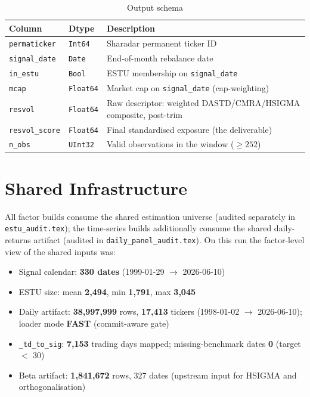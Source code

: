 \documentclass[11pt,a4paper]{article}
\begin{document}
\begin{table}[h!]
\centering
\caption{Output schema}
\begin{tabular}{llp{7.4cm}}
\toprule
\textbf{Column} & \textbf{Dtype} & \textbf{Description} \\
\midrule
\texttt{permaticker} & \texttt{Int64} & Sharadar permanent ticker ID \\
\texttt{signal\_date} & \texttt{Date} & End-of-month rebalance date \\
\texttt{in\_estu} & \texttt{Bool} & ESTU membership on \texttt{signal\_date} \\
\texttt{mcap} & \texttt{Float64} & Market cap on \texttt{signal\_date} (cap-weighting) \\
\texttt{resvol} & \texttt{Float64} & Raw descriptor: weighted DASTD/CMRA/HSIGMA composite, post-trim \\
\texttt{resvol\_score} & \texttt{Float64} & Final standardised exposure (the deliverable) \\
\texttt{n\_obs} & \texttt{UInt32} & Valid observations in the window ($\geq 252$) \\
\bottomrule
\end{tabular}
\end{table}

\section{Shared Infrastructure}

All factor builds consume the shared estimation universe
 (audited separately in
\texttt{estu\_audit.tex}); the time-series builds additionally consume the
shared daily-returns artifact (audited in \texttt{daily\_panel\_audit.tex}).
On this run the factor-level view of the shared inputs was:

\begin{itemize}[leftmargin=*,topsep=2pt,itemsep=2pt]
  \item Signal calendar: \textbf{330 dates} (1999-01-29 $\to$ 2026-06-10)
  \item ESTU size: mean \textbf{2{,}494}, min \textbf{1{,}791}, max \textbf{3{,}045}
  \item Daily artifact: \textbf{38{,}997{,}999} rows, \textbf{17{,}413} tickers (1998-01-02 $\to$ 2026-06-10); loader mode \textbf{FAST} (commit-aware gate)
  \item \texttt{\_td\_to\_sig}: \textbf{7{,}153} trading days mapped; missing-benchmark dates \textbf{0} (target $<$ 30)
  \item Beta artifact: \textbf{1{,}841{,}672} rows, 327 dates (upstream input for HSIGMA and orthogonalisation)
\end{itemize}
\end{document}
